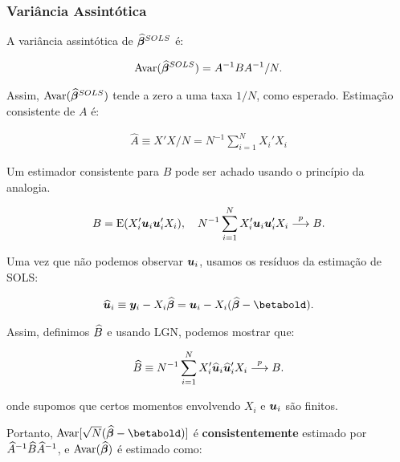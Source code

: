 \documentclass[11pt, oneside, a4paper, article]{article}
\numberwithin{equation}{section}
\begin{document}
\subsubsection{Variância Assintótica}

A variância assintótica de $\widehat{\boldsymbol{\beta}}^{SOLS}$ é:

\vspace{-1 em}
\begin{align}\label{eq:avar:sols}
	\text{Avar}(\widehat{\boldsymbol{\beta}}^{SOLS}) = A^{-1} B A^{-1}/N.
\end{align}

Assim, $\text{Avar}(\widehat{\boldsymbol{\beta}}^{SOLS})$ tende a zero a uma taxa $1/N$, como esperado.
Estimação consistente de $A$ é:

\vspace{-1 em}
\begin{align*}
	\widehat{A} \equiv X'X/N = N^{-1} \sum_{i=1}^{N} X_{i}'X_{i}
\end{align*}

Um estimador consistente para $B$ pode ser achado usando o princípio da analogia.

\vspace{-1 em}
\begin{align*}
B = \text{E}(X_{i}' \boldsymbol{u}_{i} \boldsymbol{u}_{i}' X_{i}), 
\quad
N^{-1}\sum_{i=1}^{N} X_{i}' \boldsymbol{u}_{i} \boldsymbol{u}_{i}' X_{i}  \overset{p}{\longrightarrow}  B.
\end{align*}

Uma vez que não podemos observar $\boldsymbol{u}_{i}$, usamos os resíduos da estimação de SOLS:

\vspace{-1 em}
\begin{align*}
\widehat{\mbs{u}}_{i} \equiv \mbs{y}_{i} - X_{i} \betahatbold 
=
\ubold_{i} - X_{i} (\betahatbold - \betabold).
\end{align*}

Assim, definimos $\widehat{B}$ e usando LGN, podemos mostrar que:

\vspace{-1 em}
\begin{align*}
\widehat{B} \equiv N^{-1}\sum_{i=1}^{N} X_{i}' \widehat{\boldsymbol{u}}_{i} \widehat{\boldsymbol{u}}_{i}' X_{i} 
 \overset{p}{\longrightarrow}  B.
\end{align*}

\noindent
onde supomos que certos momentos envolvendo $X_{i}$ e $\boldsymbol{u}_{i}$ são finitos.

Portanto, $\Avar[\sqrt{N}(\betahatbold - \betabold)]$ é \textbf{consistentemente} estimado por $\widehat{A}^{-1} \widehat{B} \widehat{A}^{-1}$, e $\text{Avar}(\widehat{\boldsymbol{\beta}})$ é estimado como:
\end{document}
